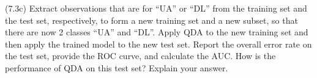 \documentclass[
  11pt,
]{article}
\newenvironment{Shaded}{\begin{snugshade}}{\end{snugshade}}
\newcommand{\CommentTok}[1]{\textcolor[rgb]{0.56,0.35,0.01}{\textit{#1}}}
\newcommand{\DecValTok}[1]{\textcolor[rgb]{0.00,0.00,0.81}{#1}}
\newcommand{\FloatTok}[1]{\textcolor[rgb]{0.00,0.00,0.81}{#1}}
\newcommand{\FunctionTok}[1]{\textcolor[rgb]{0.00,0.00,0.00}{#1}}
\newcommand{\NormalTok}[1]{#1}
\newcommand{\OtherTok}[1]{\textcolor[rgb]{0.56,0.35,0.01}{#1}}
\newcommand{\SpecialCharTok}[1]{\textcolor[rgb]{0.00,0.00,0.00}{#1}}
\newcommand{\StringTok}[1]{\textcolor[rgb]{0.31,0.60,0.02}{#1}}
\begin{document}
(7.3c) Extract observations that are for ``UA'' or ``DL'' from the
training set and the test set, respectively, to form a new training set
and a new subset, so that there are now 2 classes ``UA'' and ``DL''.
Apply QDA to the new training set and then apply the trained model to
the new test set. Report the overall error rate on the test set, provide
the ROC curve, and calculate the AUC. How is the performance of QDA on
this test set? Explain your answer.

\begin{Shaded}
\end{Shaded}
\end{document}
